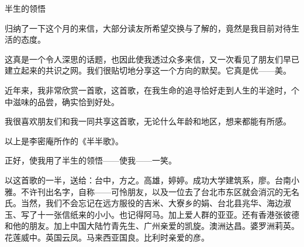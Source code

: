 \begin{center}
    \par 半生的领悟
\end{center}
\par {}
\par 归纳了一下这个月的来信，大部分读友所希望交换与了解的，竟然是我目前对待生活的态度。
\par 这真是一个令人深思的话题，也因此使我透过众多来信，又一次看见了朋友们早已建立起来的共识之网。我们很贴切地分享这一个方向的默契。它真是优——美。
\par 近年来，我非常欣赏一首歌，这首歌，在我生命的追寻恰好走到人生的半途时，个中滋味的品尝，确实恰到好处。
\par 我很喜欢朋友们和我一同共享这首歌，无论什么年龄和地区，想来都能有所感。
\par 以上是李密庵所作的《半半歌》。
\par 正好，使我用了半生的领悟——使我——一笑。
\par 以这首歌的一半，送给：台中，方之。高雄，婷婷。成功大学建筑系，廖。台南小雅。不许刊出名字，自称——可怜朋友，以及一位去了台北市东区就会消沉的无名氏。当然，我们不会忘记在远方服役的吉米、大寮乡的娟、台北县兆华、海边淑玉、写了十一张信纸来的小小。也记得阿马。加上爱人群的亚亚。还有香港张彼德和他的朋友。加上中国大陆竹青先生、广州亲爱的凯旋。澳洲达昌。婆罗洲莉英。花莲威中。英国云凤。马来西亚国良。比利时亲爱的彦。
\par {}




